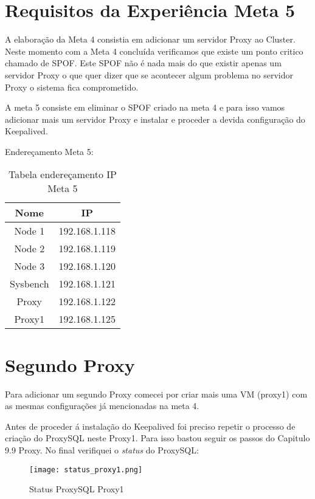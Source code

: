 \section{Requisitos da Experiência Meta 5}
A elaboração da Meta 4 consistia em adicionar um servidor Proxy ao Cluster. Neste momento com a Meta 4 concluída verificamos que existe um ponto critico chamado de \ac{SPOF}. Este \ac{SPOF} não é nada mais do que existir apenas um servidor Proxy o que quer dizer que se acontecer algum problema no servidor Proxy o sistema fica comprometido. 

A meta 5 consiste em eliminar o \ac{SPOF} criado na meta 4 e para isso vamos adicionar mais um servidor Proxy e instalar e proceder a devida configuração do Keepalived.


\hfill \break
\indent Endereçamento Meta 5:
\begin{table}[h]
\begin{center}
\begin{tabular}{||c c||} 
 \hline
 Nome & IP\\ [0.5ex] 
 \hline\hline
 Node 1 & 192.168.1.118\\ 
 \hline
 Node 2 & 192.168.1.119\\
 \hline
 Node 3 & 192.168.1.120\\
 \hline
 Sysbench & 192.168.1.121\\
 \hline
 Proxy & 192.168.1.122\\
 \hline
 Proxy1 & 192.168.1.125\\
 \hline
\end{tabular}
\caption{Tabela endereçamento IP Meta 5}
\end{center}
\end{table}

\newpage
\section{Segundo Proxy}
Para adicionar um segundo Proxy comecei por criar mais uma \ac{VM} (proxy1) com as mesmas configurações já mencionadas na meta 4.

Antes de proceder á instalação do Keepalived foi preciso repetir o processo de criação do ProxySQL neste Proxy1. Para isso bastou seguir os passos do Capitulo 9.9 Proxy.
No final verifiquei o \textit{status} do ProxySQL:

\begin{figure}[H]
\center
\texttt{[image: status\_proxy1.png]}
\caption{Status ProxySQL Proxy1}
\end{figure}

